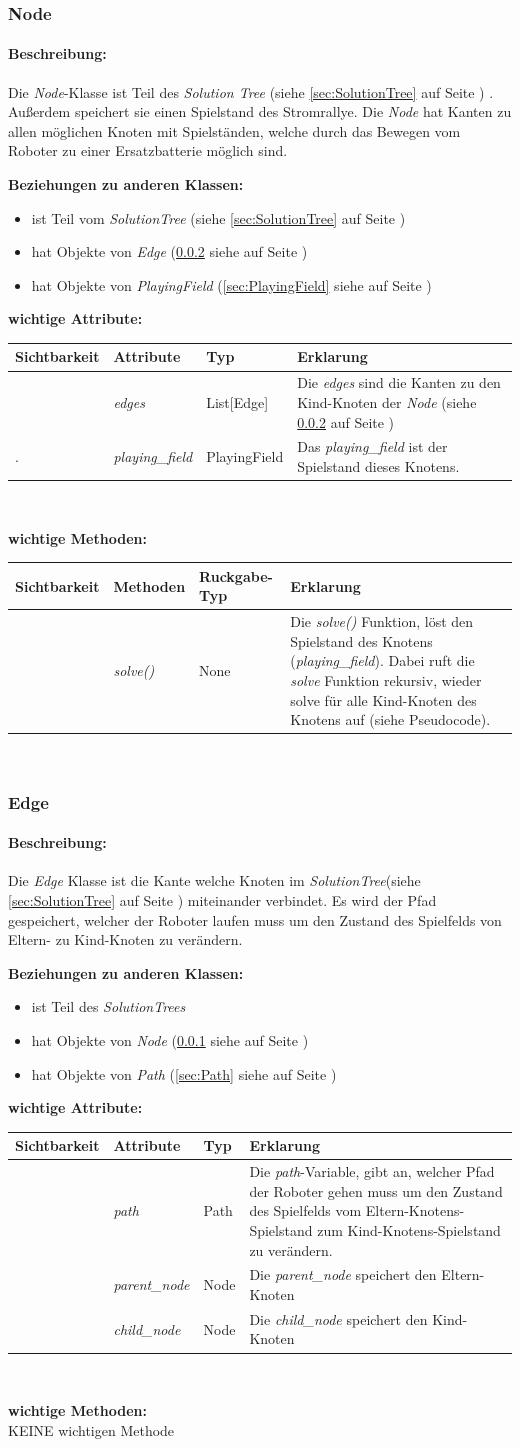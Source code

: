 \documentclass[a4paper,12pt,arial]{scrartcl}
\newenvironment{classInformation}[1]
{
    \subsubsection{#1}
    \label{sec:#1}
}
{
}
\newcommand{\addDescription}[1]{
\paragraph{Beschreibung:}
#1
}
\newenvironment{relations}
{
\textbf{Beziehungen zu anderen Klassen:}
\begin{itemize}
}
{\end{itemize}}
\newcommand{\hasObjects}[2]{
\item hat Objekte von {\textit{#1} (\ref{#2} siehe auf Seite \pageref{#2})}
}
\newcommand{\noMethods}{
    \textbf{wichtige Methoden:}
    \\
    KEINE wichtigen Methode
}
\newenvironment{classAttributes}{
    \textbf{wichtige Attribute:}
    \\
    \begin{table}[h!]
    \begin{tabular}{| p{0.15\textwidth} |p{0.15\textwidth} | p{0.15\textwidth} | p{0.5\textwidth}|}
    \hline
    Sichtbarkeit & Attribute & Typ & Erklarung \\ [0.5ex]
    \hline\hline
    }
    {
    \hline
    \end{tabular}
    \end{table}
    \\
    }
\newcommand{\addAttribute}[4]{\centering{\textbf{#1}} & \textit{#2} & #3 &  #4 \\}
\newenvironment{classMethods}
{
\textbf{wichtige Methoden:}
\\
\begin{table}[h!]
\begin{tabular}{| p{0.15\textwidth} | p{0.17\textwidth} | p{0.18\textwidth} | p{0.5\textwidth}|}
\hline
Sichtbarkeit & Methoden & Ruckgabe-Typ & Erklarung \\ [0.5ex]
\hline\hline
}
{
\hline
\end{tabular}
\end{table}
\\
}
\newcommand{\addMethod}[4]{\centering{\textbf{#1}} & \textit{#2} & #3 &  #4 \\}
\begin{document}
\begin{classInformation}{Node}
\addDescription{Die \textit{Node}-Klasse ist Teil des \textit{Solution Tree} (siehe \ref{sec:SolutionTree} auf Seite \pageref{sec:SolutionTree}) . Außerdem speichert sie einen Spielstand des Stromrallye. Die \textit{Node} hat Kanten zu allen möglichen Knoten mit Spielständen, welche durch das Bewegen vom Roboter zu einer Ersatzbatterie möglich sind.}
\begin{relations}
\item ist Teil vom \textit{SolutionTree} (siehe \ref{sec:SolutionTree} auf Seite \pageref{sec:SolutionTree})
\hasObjects{Edge}{sec:Edge}
\hasObjects{PlayingField}{sec:PlayingField}
\end{relations}
\newpage
\begin{classAttributes}
\addAttribute{-}{edges}{List[Edge]}{Die \textit{edges} sind die Kanten zu den Kind-Knoten der \textit{Node} (siehe \ref{sec:Edge} auf Seite \pageref{sec:Edge})}.
\addAttribute{-}{playing\_field}{PlayingField}{Das \textit{playing\_field} ist der Spielstand dieses Knotens.}
\end{classAttributes}


\begin{classMethods}
\addMethod{+}{solve()}{None}
{
Die \textit{solve()} Funktion, löst den Spielstand des Knotens (\textit{playing\_field}). Dabei ruft die \textit{solve} Funktion rekursiv, wieder solve für alle Kind-Knoten des Knotens auf (siehe Pseudocode).
}
\end{classMethods}
\end{classInformation}


\begin{classInformation}{Edge}
\addDescription{Die \textit{Edge} Klasse ist die Kante welche Knoten im \textit{SolutionTree}(siehe \ref{sec:SolutionTree} auf Seite \pageref{sec:SolutionTree}) miteinander verbindet.
Es wird der Pfad gespeichert, welcher der Roboter laufen muss um den Zustand des Spielfelds von Eltern- zu Kind-Knoten zu verändern.}
\begin{relations}
\item ist Teil des \textit{SolutionTrees}
\hasObjects{Node}{sec:Node}
\hasObjects{Path}{sec:Path}
\end{relations}

\begin{classAttributes}
\addAttribute{-}{path}{Path}{Die \textit{path}-Variable, gibt an, welcher Pfad der Roboter gehen muss um den Zustand des Spielfelds vom Eltern-Knotens-Spielstand zum Kind-Knotens-Spielstand zu verändern.}
\addAttribute{-}{parent\_node}{Node}{Die \textit{parent\_node}  speichert den Eltern-Knoten}
\addAttribute{-}{child\_node}{Node}{Die \textit{child\_node}  speichert den Kind-Knoten}
\end{classAttributes}
\noMethods
\end{classInformation}
\end{document}

